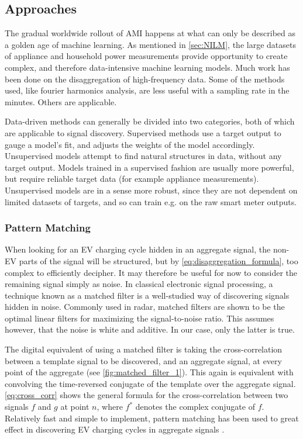 \documentclass[12pt, american]{article}
\begin{document}
\subsection{Approaches}
The gradual worldwide rollout of AMI happens at what can only be described as a golden age of machine learning. As mentioned in \autoref{sec:NILM}, the large datasets of appliance and household power measurements provide opportunity to create complex, and therefore data-intensive machine learning models. Much work has been done on the disaggregation of high-frequency data. Some of the methods used, like fourier harmonics analysis, are less useful with a sampling rate in the minutes. Others are applicable.

Data-driven methods can generally be divided into two categories, both of which are applicable to signal discovery. Supervised methods use a target output to gauge a model's fit, and adjusts the weights of the model accordingly. Unsupervised models attempt to find natural structures in data, without any target output. Models trained in a supervised fashion are usually more powerful, but require reliable target data (for example appliance measurements). Unsupervised models are in a sense more robust, since they are not dependent on limited datasets of targets, and so can train e.g. on the raw smart meter outputs. 

\subsubsection{Pattern Matching}
\label{sec:pattern_matching}
When looking for an EV charging cycle hidden in an aggregate signal, the non-EV parts of the signal will be structured, but by \autoref{eq:disaggregation_formula}, too complex to efficiently decipher. It may therefore be useful for now to consider the remaining signal simply as noise. In classical electronic signal processing, a technique known as a matched filter is a well-studied way of discovering signals hidden in noise. Commonly used in radar, matched filters are shown to be the optimal linear filters for maximizing the signal-to-noise ratio. This assumes however, that the noise is white and additive\cite{Turin1960}. In our case, only the latter is true. 

The digital equivalent of using a matched filter is taking the cross-correlation between a template signal to be discovered, and an aggregate signal, at every point of the aggregate (see \autoref{fig:matched_filter_1}). This again is equivalent with convolving the time-reversed conjugate of the template over the aggregate signal. \autoref{eq:cross_corr} shows the general formula for the cross-correlation between two signals $f$ and $g$ at point $n$, where $f^*$ denotes the complex conjugate of $f$. Relatively fast and simple to implement, pattern matching has been used to great effect in discovering EV charging cycles in aggregate signals \cite{Zhang2011}.
\end{document}

